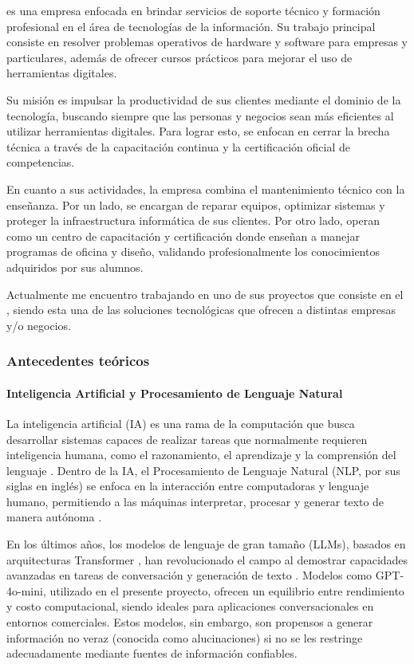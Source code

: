 \textbf{\UnidadEconomica} es una empresa enfocada en brindar servicios de soporte técnico y formación profesional en el área de tecnologías de la información. Su trabajo principal consiste en resolver problemas operativos de hardware y software para empresas y particulares, además de ofrecer cursos prácticos para mejorar el uso de herramientas digitales.

Su misión es impulsar la productividad de sus clientes mediante el dominio de la tecnología, buscando siempre que las personas y negocios sean más eficientes al utilizar herramientas digitales. Para lograr esto, se enfocan en cerrar la brecha técnica a través de la capacitación continua y la certificación oficial de competencias.

En cuanto a sus actividades, la empresa combina el mantenimiento técnico con la enseñanza. Por un lado, se encargan de reparar equipos, optimizar sistemas y proteger la infraestructura informática de sus clientes. Por otro lado, operan como un centro de capacitación y certificación donde enseñan a manejar programas de oficina y diseño, validando profesionalmente los conocimientos adquiridos por sus alumnos.

Actualmente me encuentro trabajando en uno de sus proyectos que consiste en el \textbf{\NombreProyecto}, siendo esta una de las soluciones tecnológicas que ofrecen a distintas empresas y/o negocios.

\subsubsection{Antecedentes teóricos}
\label{subsec:antecedentes_teoricos}

\paragraph{Inteligencia Artificial y Procesamiento de Lenguaje Natural}

La inteligencia artificial (IA) es una rama de la computación que busca desarrollar sistemas capaces de realizar tareas que normalmente requieren inteligencia humana, como el razonamiento, el aprendizaje y la comprensión del lenguaje \cite{russell2020artificial}. Dentro de la IA, el Procesamiento de Lenguaje Natural (NLP, por sus siglas en inglés) se enfoca en la interacción entre computadoras y lenguaje humano, permitiendo a las máquinas interpretar, procesar y generar texto de manera autónoma \cite{jurafsky2020speech}.

En los últimos años, los modelos de lenguaje de gran tamaño (LLMs), basados en arquitecturas Transformer \cite{vaswani2017attention}, han revolucionado el campo al demostrar capacidades avanzadas en tareas de conversación y generación de texto \cite{brown2020language}. Modelos como GPT-4o-mini, utilizado en el presente proyecto, ofrecen un equilibrio entre rendimiento y costo computacional, siendo ideales para aplicaciones conversacionales en entornos comerciales. Estos modelos, sin embargo, son propensos a generar información no veraz (conocida como alucinaciones) si no se les restringe adecuadamente mediante fuentes de información confiables.

